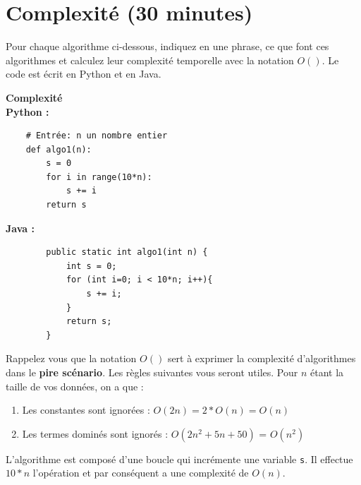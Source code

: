 \section{Complexité (30 minutes)}

Pour chaque algorithme ci-dessous, indiquez en une phrase, ce que font ces algorithmes et calculez leur complexité temporelle avec la notation $O( )$. Le code est écrit en Python et en Java.

\begin{Exercice}[10 minutes] \textbf{Complexité} \\
    \textbf{Python :}
    \begin{verbatim}
    # Entrée: n un nombre entier
    def algo1(n):
        s = 0
        for i in range(10*n):
            s += i
        return s
    \end{verbatim}
    
    \textbf{Java :}
    \begin{verbatim}
        public static int algo1(int n) {
            int s = 0;
            for (int i=0; i < 10*n; i++){
                s += i;
            }
            return s;
        }
    \end{verbatim}
    
    \begin{conseil}
    Rappelez vous que la notation $O()$ sert à exprimer la complexité d'algorithmes dans le \textbf{pire scénario}. Les règles suivantes vous seront utiles. Pour $n$ étant la taille de vos données, on a que :
    \begin{enumerate}
        \item Les constantes sont ignorées : $O(2n) = 2*O(n) = O(n)$ 
        \item Les termes dominés sont ignorés : $O(2n^2+5n+50)$ = $O(n^2)$
    \end{enumerate}
    \end{conseil}
    \begin{solution}
        L'algorithme est composé d'une boucle qui incrémente une variable \lstinline{s}. Il effectue $10*n$ l'opération et par conséquent a une complexité de $O(n)$.
    \end{solution}
\end{Exercice}

